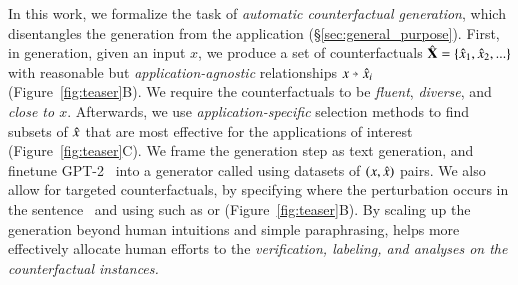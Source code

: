 In this work, we formalize the task of \emph{automatic counterfactual generation}, which disentangles the generation from the application (\S\ref{sec:general_purpose}).
First, in generation, given an input $x$, we produce a set of counterfactuals $\hat{\mathbf{X}} = \{\hat{x}_1, \hat{x}_2, ...\}$ with reasonable but \emph{application-agnostic} relationships $x \veryshortarrow \xp_i$ (Figure~\ref{fig:teaser}B).
We require the counterfactuals to be \emph{fluent}, \emph{diverse}, and \emph{close to $x$}.
Afterwards, we use \emph{application-specific} selection methods to find subsets of $\hat{x}$ that are most effective for the applications of interest (Figure~\ref{fig:teaser}C).
We frame the generation step as text generation, and finetune GPT-2~\cite{radford2019language} into a generator called \emph{\sysname} using datasets of $(x, \hat{x})$ pairs. 
We also allow for targeted counterfactuals, by specifying where the perturbation occurs in the sentence~\cite{donahue2020enabling} and using \tagstrs such as  or  (Figure~\ref{fig:teaser}B).
By scaling up the generation beyond human intuitions and simple paraphrasing, \sysname helps more effectively allocate human efforts to the \emph{verification, labeling, and analyses on the counterfactual instances.}

